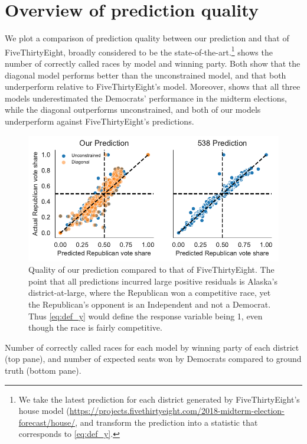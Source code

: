 \documentclass[12pt]{article}
\begin{document}
\section{Overview of prediction quality}
\label{sec:overview}
We plot a comparison of prediction quality between our prediction and that of FiveThirtyEight, broadly considered to be the state-of-the-art.\footnote{We take the latest prediction for each district generated by FiveThirtyEight's house model (\url{https://projects.fivethirtyeight.com/2018-midterm-election-forecast/house/}, and transform the prediction into a statistic that corresponds to \eqref{eq:def_y}.}   shows the number of correctly called races by model and winning party. Both  show that the diagonal model performs better than the unconstrained model, and that both underperform relative to FiveThirtyEight's model. Moreover,  shows that all three models underestimated the Democrats' performance in the midterm elections, while the diagonal outperforms unconstrained, and both of our models underperform against FiveThirtyEight's predictions.
\begin{figure}[tb]
  \centering
  \includegraphics{prediction_quality.pdf}
  \caption{Quality of our prediction compared to that of FiveThirtyEight. The point that all predictions incurred large positive residuals is Alaska's district-at-large, where the Republican won a competitive race, yet the Republican's opponent is an Independent and not a Democrat. Thus \eqref{eq:def_y} would define the response variable being 1, even though the race is fairly competitive.}
  \label{fig:quality}
\end{figure}
\begin{table}[tb]
  \caption{Number of correctly called races for each model by winning party of each district (top pane), and number of expected seats won by Democrats compared to ground truth (bottom pane).}
  \label{tab:res}
  \vspace{.4em}
  \centering

\end{table}
\end{document}
